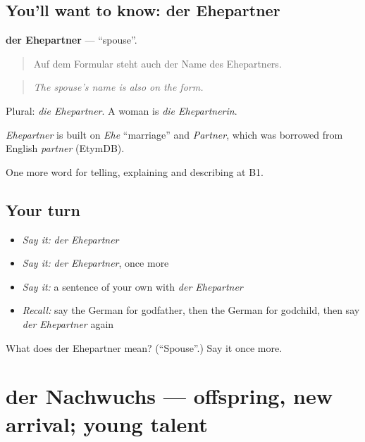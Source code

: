 \subsection*{You'll want to know: der Ehepartner}
\textbf{der Ehepartner} — \textquotedblleft{}spouse\textquotedblright{}.

\begin{quote}
Auf dem Formular steht auch der Name des Ehepartners.
\end{quote}

\begin{quote}
\emph{The spouse's name is also on the form.}
\end{quote}

Plural: \emph{die Ehepartner}. A woman is \emph{die Ehepartnerin}.

\begin{cousinweb}
\emph{Ehepartner} is built on \emph{Ehe} \textquotedblleft{}marriage\textquotedblright{} and \emph{Partner}, which was borrowed from English \emph{partner} (EtymDB).
\end{cousinweb}

\begin{grammarlens}[title={What you've built}]
One more word for telling, explaining and describing at B1.
\end{grammarlens}

\subsection*{Your turn}
\begin{itemize}
\raggedright
  \item \emph{Say it:} \emph{der Ehepartner}
  \item \emph{Say it:} \emph{der Ehepartner}, once more
  \item \emph{Say it:} a sentence of your own with \emph{der Ehepartner}
  \item \emph{Recall:} say the German for godfather, then the German for godchild, then say \emph{der Ehepartner} again
\end{itemize}

\begin{tcolorbox}[breakable,colback=teal!4,colframe=teal!35!black,title={Before you move on}]
What does der Ehepartner mean? (\textquotedblleft{}Spouse\textquotedblright{}.) Say it once more.
\end{tcolorbox}
\section[der Nachwuchs]{der Nachwuchs — offspring, new arrival; young talent}

